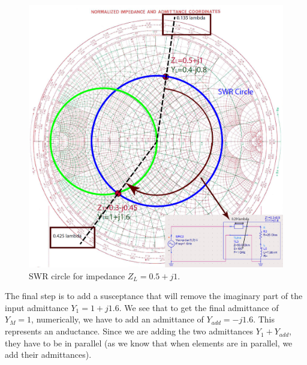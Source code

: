 \documentclass{ximera}
\begin{document}
\begin{figure}[htbp]
\begin{center}
\includegraphics[scale=0.4]{../jpg/Match2.jpg}
\end{center}
\caption{SWR circle for impedance $Z_L=0.5+j1$.  }
\label{fig:SWRfor25Ohm}
\end{figure}


The final step is to add a susceptance that will remove the imaginary part of the input admittance $Y_1=1+j 1.6$. We see that to get the final admittance of $Y_M=1$, numerically, we have to add an admittance of $Y_{add}=-j1.6$. This represents an anductance. Since we are adding the two admittances $Y_1+Y_{add}$, they have to be in parallel (as we know that when elements are in parallel, we add their admittances).
\end{document}
